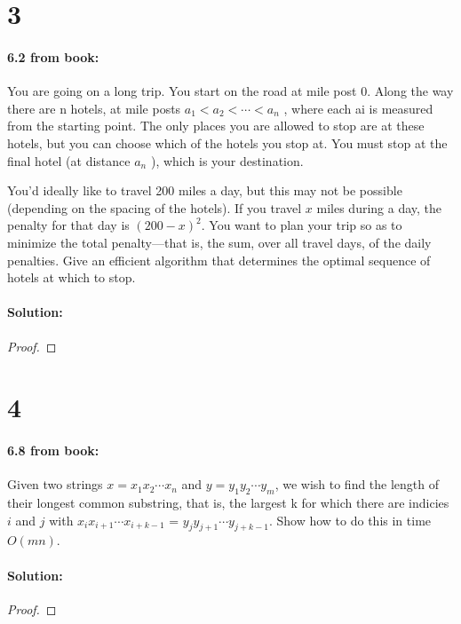 \documentclass[12pt]{article}
\newcommand{\BigO}[1]{\ensuremath{O(#1)}}
\begin{document}
\section*{3}
\paragraph{6.2 from book:}
You are going on a long trip. You start on the road at mile post 0. Along the way there are n
hotels, at mile posts $a_1 < a_2 < \cdots < a_n$ , where each ai is measured from the starting point. The
only places you are allowed to stop are at these hotels, but you can choose which of the hotels
you stop at. You must stop at the final hotel (at distance $a_n$ ), which is your destination.

You’d ideally like to travel 200 miles a day, but this may not be
possible (depending on the spacing of the hotels). If you travel $x$ miles
during a day, the penalty for that day is $(200 - x)^2$.  You want to
plan your trip so as to minimize the total penalty—that is,
the sum, over all travel days, of the daily penalties.  Give an
efficient algorithm that determines the optimal sequence of hotels at
which to stop.

\paragraph{Solution:}
\begin{proof}

\end{proof}

\section*{4}
\paragraph{6.8 from book:}
Given two strings $x = x_1 x_2 \cdots x_n$ and $y = y_1 y_2 \cdots y_m$,
we wish to find the length of their longest common substring, that is,
the largest k for which there are indicies $i$ and $j$ with $x_i x_{i + 1}
\cdots x_{i + k - 1}$ = $y_j y_{j + 1} \cdots y_{j + k - 1}$. Show how
to do this in time $\BigO{mn}$.

\paragraph{Solution:}
\begin{proof}

\end{proof}
\end{document}

